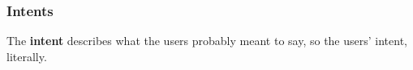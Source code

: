 \documentclass[11pt,a4paper]{article}
\begin{document}
\subsubsection{Intents}
The \textbf{intent} describes what the users probably meant to say, so the users' intent, literally.


%
%
%
%
\end{document}

